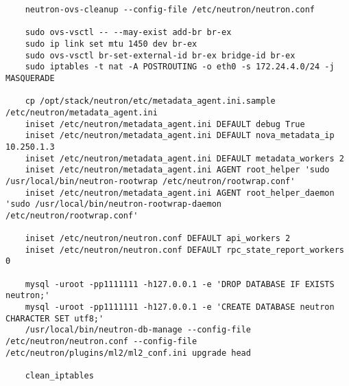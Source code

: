 \documentclass[a4paper,left=1.5cm,right=1.5cm,11pt]{article}
\begin{document}
\begin{lstlisting}
	neutron-ovs-cleanup --config-file /etc/neutron/neutron.conf

	sudo ovs-vsctl -- --may-exist add-br br-ex
	sudo ip link set mtu 1450 dev br-ex
	sudo ovs-vsctl br-set-external-id br-ex bridge-id br-ex
	sudo iptables -t nat -A POSTROUTING -o eth0 -s 172.24.4.0/24 -j MASQUERADE

	cp /opt/stack/neutron/etc/metadata_agent.ini.sample /etc/neutron/metadata_agent.ini
	iniset /etc/neutron/metadata_agent.ini DEFAULT debug True
	iniset /etc/neutron/metadata_agent.ini DEFAULT nova_metadata_ip 10.250.1.3
	iniset /etc/neutron/metadata_agent.ini DEFAULT metadata_workers 2
	iniset /etc/neutron/metadata_agent.ini AGENT root_helper 'sudo /usr/local/bin/neutron-rootwrap /etc/neutron/rootwrap.conf'
	iniset /etc/neutron/metadata_agent.ini AGENT root_helper_daemon 'sudo /usr/local/bin/neutron-rootwrap-daemon /etc/neutron/rootwrap.conf'

	iniset /etc/neutron/neutron.conf DEFAULT api_workers 2
	iniset /etc/neutron/neutron.conf DEFAULT rpc_state_report_workers 0

	mysql -uroot -pp1111111 -h127.0.0.1 -e 'DROP DATABASE IF EXISTS neutron;'
	mysql -uroot -pp1111111 -h127.0.0.1 -e 'CREATE DATABASE neutron CHARACTER SET utf8;'
	/usr/local/bin/neutron-db-manage --config-file /etc/neutron/neutron.conf --config-file /etc/neutron/plugins/ml2/ml2_conf.ini upgrade head

	clean_iptables
	\end{lstlisting}
\end{document}
